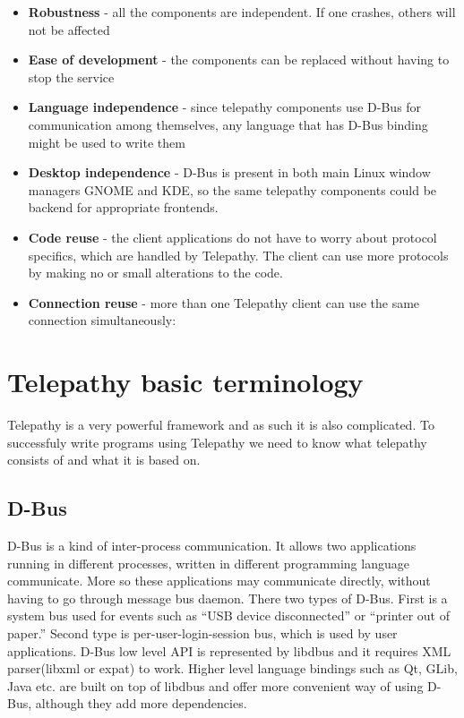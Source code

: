 \begin{itemize}

	\item {\bf Robustness} - all the components are independent. If one crashes, others will not be affected

	\item {\bf Ease of development} - the components can be replaced without having to stop the service 

	\item {\bf Language independence} - since telepathy components use D-Bus for communication among themselves, any language that has D-Bus binding might be used to write them

	\item {\bf Desktop independence} - D-Bus is present in both main Linux window managers GNOME and KDE, so the same telepathy components could be backend for appropriate frontends.

	\item {\bf Code reuse} - the client applications do not have to worry about protocol specifics, which are handled by Telepathy. The client can use more protocols by making no or small alterations to the code.

	\item {\bf Connection reuse} - more than one Telepathy client can use the same connection simultaneously:
\end{itemize}

\section{Telepathy basic terminology}
Telepathy is a very powerful framework and as such it is also complicated. To successfuly write programs using Telepathy we need to know what telepathy consists of and what it is based on. 

\subsection*{D-Bus}
D-Bus is a kind of inter-process communication. It allows two applications running in different processes, written in different programming language communicate. More so these applications may communicate directly, without having to go through message bus daemon. There two types of D-Bus. First is a system bus used for events such as ``USB device disconnected'' or ``printer out of paper.'' Second type is per-user-login-session bus, which is used by user applications. D-Bus low level API is represented by libdbus and it requires XML parser(libxml or expat) to work. Higher level language bindings such as Qt, GLib, Java etc. are built on top of libdbus and offer more convenient way of using D-Bus, although they add more dependencies.\cite{dbus}\cite{TPWiki} 

